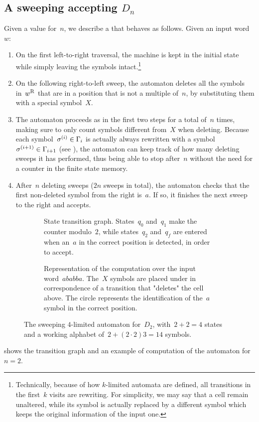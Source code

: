 \subsection{A sweeping \texorpdfstring{\kDLA}{k-DLA} accepting \texorpdfstring{$D_n$}{Ln}}
Given a value for~$n$, we describe a  that behaves as follows. Given an input word~$w$:
\begin{enumerate}
	\item On the first left-to-right traversal, the machine is kept in the initial state while simply leaving the symbols intact.\footnote{%
		      Technically, because of how $k$-limited automata are defined, all transitions in the first~$k$ visits are rewriting. For simplicity, we may say that a cell remain unaltered, while its symbol is actually replaced by a different symbol which keeps the original information of the input one.}
	\item On the following right-to-left sweep, the automaton deletes all the symbols in~$w^{\mathrm R}$ that are in a position that is not a multiple of~$n$, by substituting them with a special symbol~$X$.
	\item The automaton proceeds as in the first two steps for a total of~$n$ times, making sure to only count symbols different from~$X$ when deleting.
	      Because each symbol~$\sigma^{(i)}\in\Gamma_i$ is actually always rewritten with a symbol~$\sigma^{(i+1)}\in\Gamma_{i+1}$ (see ), the automaton can keep track of how many deleting sweeps it has performed, thus being able to stop after~$n$ without the need for a counter in the finite state memory.
	\item After~$n$ deleting sweeps ($2n$ sweeps in total), the automaton checks that the first non-deleted symbol from the right is~$a$.
	      If so, it finishes the next sweep to the right and accepts.
\end{enumerate}

\begin{figure}
	\centering
	\begin{subfigure}[b]{0.52\textwidth}
		\centering
		
		\caption{State transition graph.
			States~$q_0$ and~$q_1$ make the counter modulo~$2$, while states~$q_2$ and~$q_f$ are entered when an~$a$ in the correct position is detected, in order to accept.}
	\end{subfigure}
	\hfill
	\begin{subfigure}[b]{0.46\textwidth}
		\centering
		
		\caption{Representation of the computation over the input word~$ababba$.
			The~$X$ symbols are placed under in correspondence of a transition that "deletes" the cell above.
			The circle represents the identification of the~$a$ symbol in the correct position.}
	\end{subfigure}

	\caption[The sweeping $4$-limited automaton for~$D_2$ witnessing the lower bound for the gap between sweeping \kDLAs and \ONFAs.]{The sweeping $4$-limited automaton for~$D_2$, with~$2+2=4$ states and a working alphabet of~$2+(2\cdot2)3=14$ symbols.}
	\label{fig:sweepingDn}
\end{figure}
 shows the transition graph and an example of computation of the automaton for~$n=2$.

